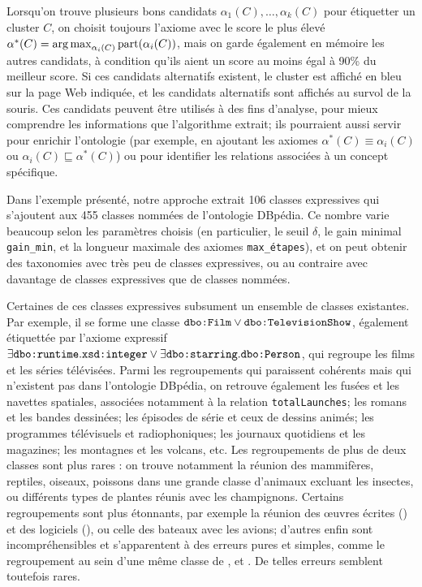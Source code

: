 Lorsqu'on trouve plusieurs bons candidats $\alpha_1(C), \ldots, \alpha_k(C)$ pour étiquetter un cluster $C$, on choisit toujours l'axiome avec le score le plus élevé $\alpha^*(C) = \operatorname*{arg\,max}_{\alpha_i(C)} \textrm{part}(\alpha_i(C))$, mais on garde également en mémoire les autres candidats, à condition qu'ils aient un score au moins égal à 90\% du meilleur score. Si ces candidats alternatifs existent, le cluster est affiché en bleu sur la page Web indiquée, et les candidats alternatifs sont affichés au survol de la souris.
Ces candidats peuvent être utilisés à des fins d'analyse, pour mieux comprendre les informations que l'algorithme extrait; ils pourraient aussi servir pour enrichir l'ontologie (par exemple, en ajoutant les axiomes $\alpha^*(C) \equiv \alpha_i(C)$ ou $\alpha_i(C) \sqsubseteq \alpha^*(C)$) ou pour identifier les relations associées à un concept spécifique.

Dans l'exemple présenté, notre approche extrait 106 classes expressives qui s'ajoutent aux 455 classes nommées de l'ontologie DBpédia.
Ce nombre varie beaucoup selon les paramètres choisis (en particulier, le seuil $\delta$, le gain minimal \texttt{gain\_min}, et la longueur maximale des axiomes \texttt{max\_étapes}), et on peut obtenir des taxonomies avec très peu de classes expressives, ou au contraire avec davantage de classes expressives que de classes nommées.

Certaines de ces classes expressives subsument un ensemble de classes existantes. Par exemple, il se forme une classe $\texttt{dbo:Film} \lor \texttt{dbo:TelevisionShow}$, également étiquettée par l'axiome expressif $\exists \texttt{dbo:runtime}.\texttt{xsd:integer} \lor \exists \texttt{dbo:starring}.\texttt{dbo:Person}$, qui regroupe les films et les séries télévisées. Parmi les regroupements qui paraissent cohérents mais qui n'existent pas dans l'ontologie DBpédia, on retrouve également les fusées et les navettes spatiales, associées notamment à la relation \texttt{totalLaunches}; les romans et les bandes dessinées; les épisodes de série et ceux de dessins animés; les programmes télévisuels et radiophoniques; les journaux quotidiens et les magazines; les montagnes et les volcans, etc. Les regroupements de plus de deux classes sont plus rares : on trouve notamment la réunion des mammifères, reptiles, oiseaux, poissons dans une grande classe d'animaux excluant les insectes, ou différents types de plantes réunis avec les champignons. Certains regroupements sont plus étonnants, par exemple la réunion des œuvres écrites () et des logiciels (), ou celle des bateaux avec les avions; d'autres enfin sont incompréhensibles et s'apparentent à des erreurs pures et simples, comme le regroupement au sein d'une même classe de ,  et . De telles erreurs semblent toutefois rares. %

